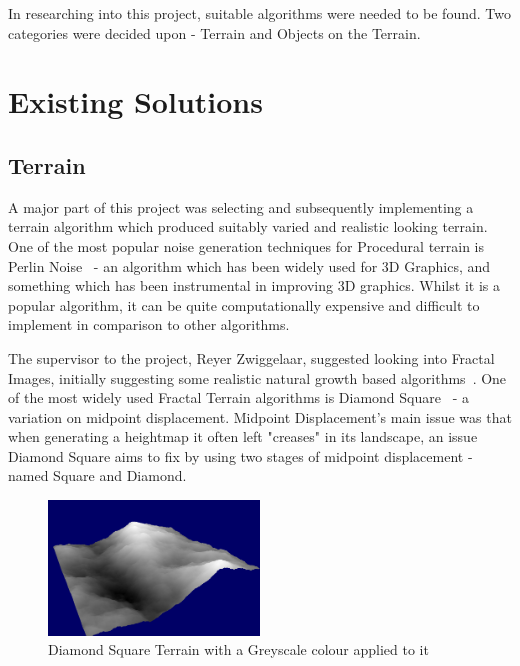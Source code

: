 \documentclass[a4paper,10pt]{report}
\begin{document}
In researching into this project, suitable algorithms were needed to be found. Two categories were decided upon - Terrain and Objects on the Terrain. \medskip

\section{Existing Solutions}

\subsection{Terrain}

A major part of this project was selecting and subsequently implementing a terrain algorithm which produced suitably varied and realistic looking terrain. One of the most popular noise generation techniques for Procedural terrain is Perlin Noise~\cite{perlin2002improving} - an algorithm which has been widely used for 3D Graphics, and something which has been instrumental in improving 3D graphics. Whilst it is a popular algorithm, it can be quite computationally expensive and difficult to implement in comparison to other algorithms.\medskip

The supervisor to the project, Reyer Zwiggelaar, suggested looking into Fractal Images, initially suggesting some realistic natural growth based algorithms~\cite{Bilsborough3424}. One of the most widely used Fractal Terrain algorithms is Diamond Square~\cite{olsen2004realtime} - a variation on midpoint displacement. Midpoint Displacement's main issue was that when generating a heightmap it often left "creases" in its landscape, an issue Diamond Square aims to fix by using two stages of midpoint displacement - named Square and Diamond.  \medskip

\begin{figure}[h!]
    \centering
  \includegraphics[width=0.5\textwidth]{Images/Screenshots/DiamondSquareGreyScale.png}
 \caption{Diamond Square Terrain with a Greyscale colour applied to it}
 \label{fig:DiamondSquareGrey}
\end{figure}
\end{document}
